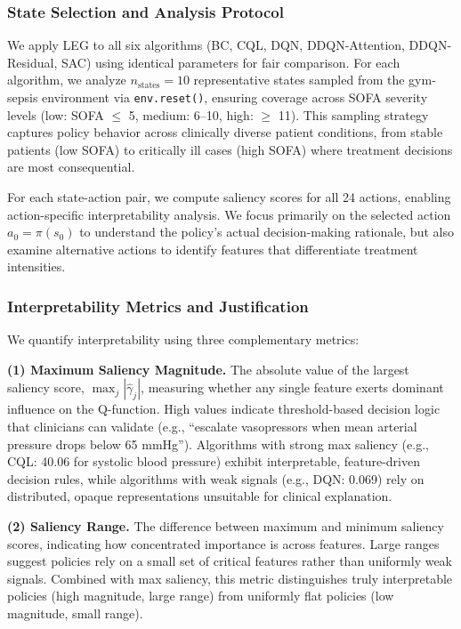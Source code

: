 \subsubsection{State Selection and Analysis Protocol}

We apply LEG to all six algorithms (BC, CQL, DQN, DDQN-Attention, DDQN-Residual, SAC) using identical parameters for fair comparison. For each algorithm, we analyze $n_{\text{states}} = 10$ representative states sampled from the gym-sepsis environment via \texttt{env.reset()}, ensuring coverage across SOFA severity levels (low: SOFA $\leq$ 5, medium: 6--10, high: $\geq$ 11). This sampling strategy captures policy behavior across clinically diverse patient conditions, from stable patients (low SOFA) to critically ill cases (high SOFA) where treatment decisions are most consequential.

For each state-action pair, we compute saliency scores for all 24 actions, enabling action-specific interpretability analysis. We focus primarily on the selected action $a_0 = \pi(s_0)$ to understand the policy's actual decision-making rationale, but also examine alternative actions to identify features that differentiate treatment intensities.

\subsubsection{Interpretability Metrics and Justification}

We quantify interpretability using three complementary metrics:

\textbf{(1) Maximum Saliency Magnitude.} The absolute value of the largest saliency score, $\max_j |\hat{\gamma}_j|$, measuring whether any single feature exerts dominant influence on the Q-function. High values indicate threshold-based decision logic that clinicians can validate (e.g., ``escalate vasopressors when mean arterial pressure drops below 65 mmHg''). Algorithms with strong max saliency (e.g., CQL: 40.06 for systolic blood pressure) exhibit interpretable, feature-driven decision rules, while algorithms with weak signals (e.g., DQN: 0.069) rely on distributed, opaque representations unsuitable for clinical explanation.

\textbf{(2) Saliency Range.} The difference between maximum and minimum saliency scores, indicating how concentrated importance is across features. Large ranges suggest policies rely on a small set of critical features rather than uniformly weak signals. Combined with max saliency, this metric distinguishes truly interpretable policies (high magnitude, large range) from uniformly flat policies (low magnitude, small range).

